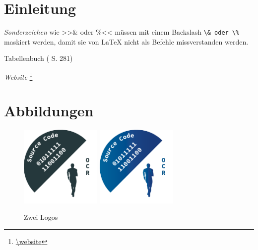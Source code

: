 \section*{Einleitung}

\emph{Sonderzeichen}  wie >>\& oder \%<< müssen mit einem Backslash \verb|\& oder \%| maskiert werden, 
damit sie von LaTeX nicht als Befehle missverstanden werden.

Tabellenbuch (\textcite{bell:2021:tabellenbuchKfz} S. 281)

\emph{Website} \footnote{\url{\website}} 

\clearpage
\section*{Abbildungen}%
			
	\begin{figure}[!h]
	\centering
	{\includegraphics[width=0.35\textwidth]{images/Logo/Logo1}}
	{\includegraphics[width=0.35\textwidth]{images/Logo/Logo2}}
	\caption{Zwei Logos}\label{Logos}
	\end{figure}

\clearpage
